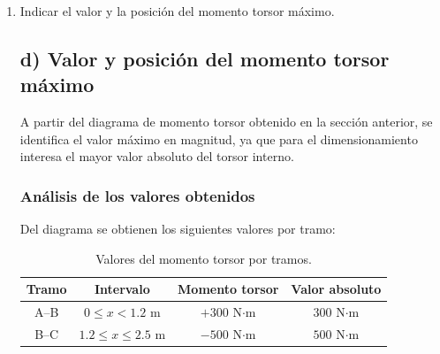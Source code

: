 \documentclass[12pt,a4paper]{article}
\begin{document}
\begin{enumerate}
\subsubsection*{Interpretación del diagrama}

El diagrama muestra dos tramos de momento torsor constante, lo que confirma que no existen cargas distribuidas a lo largo del eje. En A--B, el torsor interno es positivo y de menor magnitud, ya que en ese tramo solo actúa la reacción del empotramiento. En B--C, el diagrama cambia bruscamente por la aplicación del momento puntual en B y pasa a un valor constante negativo de mayor magnitud. Esto indica que el tramo final concentra la condición más exigente desde el punto de vista torsional. Finalmente, la carga aplicada en C permite que el diagrama cierre en equilibrio.

\item[d)] Indicar el valor y la posición del momento torsor máximo.

\subsection*{d) Valor y posición del momento torsor máximo}

A partir del diagrama de momento torsor obtenido en la sección anterior, se identifica el valor máximo en magnitud, ya que para el dimensionamiento interesa el mayor valor absoluto del torsor interno.

\subsubsection*{Análisis de los valores obtenidos}

Del diagrama se obtienen los siguientes valores por tramo:

\begin{table}[H]
\centering
\begin{tabular}{|c|c|c|c|}
\hline
\textbf{Tramo} & \textbf{Intervalo} & \textbf{Momento torsor} & \textbf{Valor absoluto} \\
\hline
A--B & $0 \leq x < 1.2$ m & $+300$ N$\cdot$m & $300$ N$\cdot$m \\
\hline
B--C & $1.2 \leq x \leq 2.5$ m & $-500$ N$\cdot$m & $500$ N$\cdot$m \\
\hline
\end{tabular}
\caption{Valores del momento torsor por tramos.}
\label{tab:valores_torsor}
\end{table}


\end{enumerate}
\end{document}
